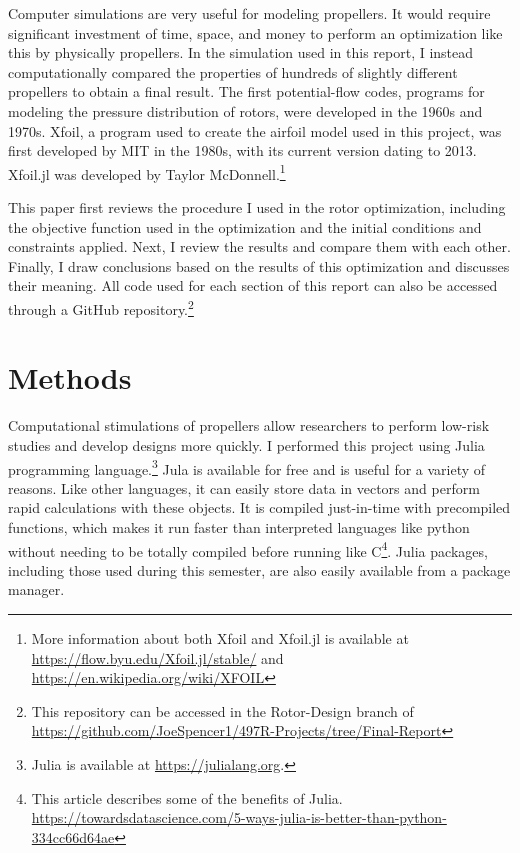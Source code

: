 \documentclass[journal ]{new-aiaa}
\begin{document}
Computer simulations are very useful for modeling propellers. It would require significant investment of time, space, and money to perform an optimization like this by physically propellers. In the simulation used in this report, I instead computationally compared the properties of hundreds of slightly different propellers to obtain a final result. The first potential-flow codes, programs for modeling the pressure distribution of rotors, were developed in the 1960s and 1970s. Xfoil, a program used to create the airfoil model used in this project, was first developed by MIT in the 1980s, with its current version dating to 2013. Xfoil.jl was developed by Taylor McDonnell.\footnote{More information about both Xfoil and Xfoil.jl is available at \url{https://flow.byu.edu/Xfoil.jl/stable/} and \url{https://en.wikipedia.org/wiki/XFOIL}}

This paper first reviews the procedure I used in the rotor optimization, including the objective function used in the optimization and the initial conditions and constraints applied. Next, I review the results and compare them with each other. Finally, I draw conclusions based on the results of this optimization and discusses their meaning. All code used for each section of this report can also be accessed through a GitHub repository.\footnote{This repository can be accessed in the Rotor-Design branch of \url{https://github.com/JoeSpencer1/497R-Projects/tree/Final-Report}}


\section{Methods}

Computational stimulations of propellers allow researchers to perform low-risk studies and develop designs more quickly. I performed this project using Julia programming language.\footnote{Julia is available at \url{https://julialang.org}.} Jula is available for free and is useful for a variety of reasons. Like other languages, it can easily store data in vectors and perform rapid calculations with these objects. It is compiled just-in-time with precompiled functions, which makes it run faster than interpreted languages like python without needing to be totally compiled before running like C\footnote{This article describes some of the benefits of Julia. \url{https://towardsdatascience.com/5-ways-julia-is-better-than-python-334cc66d64ae}}. Julia  packages, including those used during this semester, are also easily available from a package manager.
\end{document}
